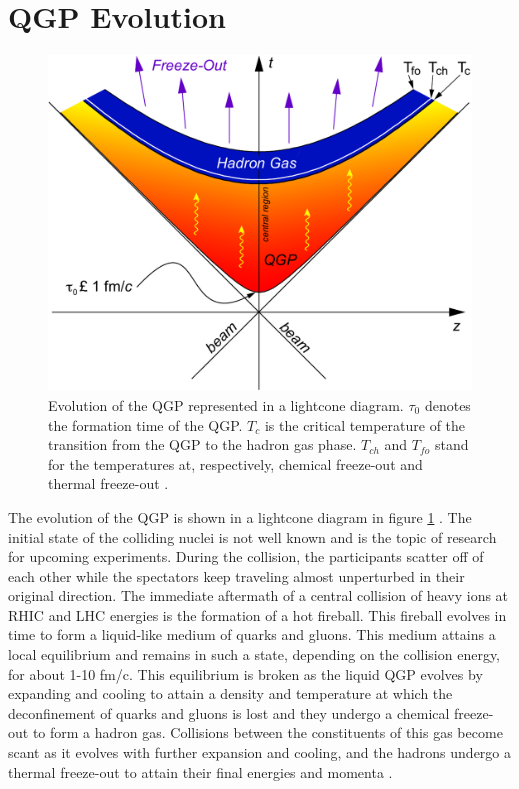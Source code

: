\section{QGP Evolution}
\begin{figure}[h]
  \centering
  \includegraphics[width=5.5in]{figures/LightCone1_color-crop_NThesis.pdf}
  \caption{Evolution of the QGP represented in a lightcone diagram. $\tau_{0}$ denotes the formation time of the QGP. $T_{c}$ is the critical temperature of the transition from the QGP to the hadron gas phase. $T_{ch}$ and $T_{fo}$ stand for the temperatures at, respectively, chemical freeze-out and thermal freeze-out \cite{Connors:2017ptx}.}\label{fig:lightcone}
\end{figure}
The evolution of the QGP is shown in a lightcone diagram in figure \ref{fig:lightcone} \cite{Connors:2017ptx}. The initial state of the colliding nuclei is not well known and is the topic of research for upcoming experiments. During the collision, the participants scatter off of each other while the spectators keep traveling almost unperturbed in their original direction. The immediate aftermath of a central collision of heavy ions at RHIC and LHC energies is the formation of a hot fireball. This fireball evolves in time to form a liquid-like medium of quarks and gluons. This medium attains a local equilibrium and remains in such a state, depending on the collision energy, for about 1-10 fm/c. This equilibrium is broken as the liquid QGP evolves by expanding and cooling to attain a density and temperature at which the deconfinement of quarks and gluons is lost and they undergo a chemical freeze-out to form a hadron gas. Collisions between the constituents of this gas become scant as it evolves with further expansion and cooling, and the hadrons undergo a thermal freeze-out to attain their final energies and momenta \cite{Connors:2017ptx}.

